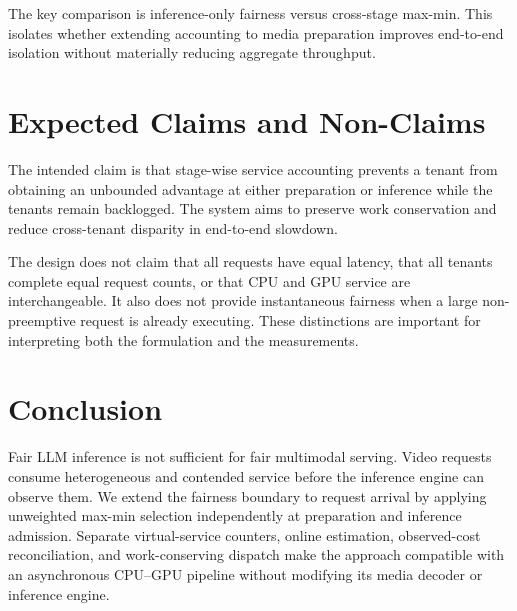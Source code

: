 \documentclass[sigplan,anonymous,review,nonacm]{acmart}
\begin{document}
The key comparison is inference-only fairness versus cross-stage max-min.
This isolates whether extending accounting to media preparation improves
end-to-end isolation without materially reducing aggregate throughput.

\section{Expected Claims and Non-Claims}

The intended claim is that stage-wise service accounting prevents a tenant
from obtaining an unbounded advantage at either preparation or inference while
the tenants remain backlogged. The system aims to preserve work conservation
and reduce cross-tenant disparity in end-to-end slowdown.

The design does not claim that all requests have equal latency, that all
tenants complete equal request counts, or that CPU and GPU service are
interchangeable. It also does not provide instantaneous fairness when a large
non-preemptive request is already executing. These distinctions are important
for interpreting both the formulation and the measurements.

\section{Conclusion}

Fair LLM inference is not sufficient for fair multimodal serving. Video
requests consume heterogeneous and contended service before the inference
engine can observe them. We extend the fairness boundary to request arrival by
applying unweighted max-min selection independently at preparation and
inference admission. Separate virtual-service counters, online estimation,
observed-cost reconciliation, and work-conserving dispatch make the approach
compatible with an asynchronous CPU--GPU pipeline without modifying its media
decoder or inference engine.



\end{document}
